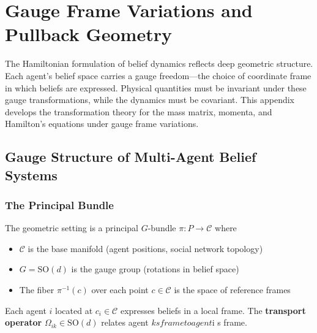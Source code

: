 \documentclass[12pt]{article}
\begin{document}
\appendix

\appendix


\section{Gauge Frame Variations and Pullback Geometry}
\label{app:gauge}

The Hamiltonian formulation of belief dynamics reflects deep geometric structure. Each agent's belief space carries a gauge freedom---the choice of coordinate frame in which beliefs are expressed. Physical quantities must be invariant under these gauge transformations, while the dynamics must be covariant. This appendix develops the transformation theory for the mass matrix, momenta, and Hamilton's equations under gauge frame variations.

\subsection{Gauge Structure of Multi-Agent Belief Systems}

\subsubsection{The Principal Bundle}

The geometric setting is a principal $G$-bundle $\pi: P \to \mathcal{C}$ where

\begin{itemize}
    \item $\mathcal{C}$ is the base manifold (agent positions, social network topology)
    \item $G = \mathrm{SO}(d)$ is the gauge group (rotations in belief space)
    \item The fiber $\pi^{-1}(c)$ over each point $c \in \mathcal{C}$ is the space of reference frames
\end{itemize}

Each agent $i$ located at $c_i \in \mathcal{C}$ expresses beliefs in a local frame. The \textbf{transport operator} $\Omega_{ik} \in \mathrm{SO}(d)$ relates agent $k
s frame to agent $i
s frame.
\end{document}
